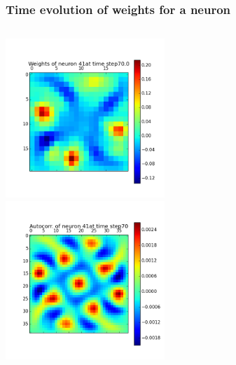 \begin{frame}
\frametitle{Time evolution of weights for a neuron}
\begin{columns}[t]
\centering
\includegraphics[width=6cm,height=6cm]{neurons/neuron_w_41_t_70.png}\\
\centering
\includegraphics[width=6cm,height=6cm]{neurons/neuron_a_41_t_70.png}\\
\end{columns}
\end{frame}

